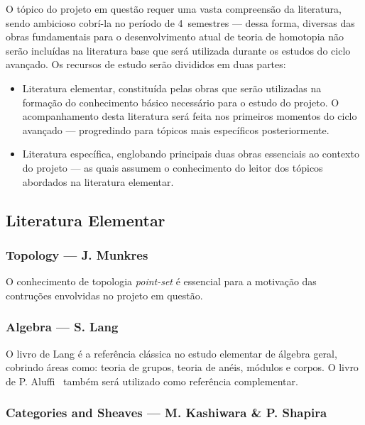 \documentclass[11pt,reqno]{amsart}
\theoremstyle{definition}
\begin{document}
O tópico do projeto em questão requer uma vasta compreensão da literatura, sendo
ambicioso cobrí-la no período de 4~semestres --- dessa forma, diversas das obras
fundamentais para o desenvolvimento atual de teoria de homotopia não serão
incluídas na literatura base que será utilizada durante os estudos do ciclo
avançado. Os recursos de estudo serão divididos em duas partes:
\begin{itemize}\setlength\itemsep{0em}
\item Literatura elementar, constituída pelas obras que serão utilizadas na
  formação do conhecimento básico necessário para o estudo do projeto. O
  acompanhamento desta literatura será feita nos primeiros momentos do ciclo
  avançado --- progredindo para tópicos mais específicos posteriormente.

\item Literatura específica, englobando principais duas obras essenciais ao
  contexto do projeto --- as quais assumem o conhecimento do leitor dos tópicos
  abordados na literatura elementar.
\end{itemize}

\subsection{Literatura Elementar}\label{sub:lit-elem}

\subsubsection{\textbf{Topology} --- J. Munkres~\cite{Mun00}}

O conhecimento de topologia \textit{point-set} é essencial para a motivação das
contruções envolvidas no projeto em questão.

\subsubsection{\textbf{Algebra} --- S. Lang~\cite{Lang93}}

O livro de Lang é a referência clássica no estudo elementar de álgebra geral,
cobrindo áreas como: teoria de grupos, teoria de anéis, módulos e corpos. O
livro de P. Aluffi~\cite{Aluf09} também será utilizado como referência
complementar.

\subsubsection{%
  \textbf{Categories and Sheaves} --- M. Kashiwara \& P. Shapira~\cite{Shap06}
}%
\end{document}
